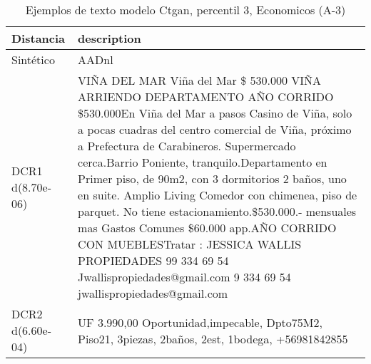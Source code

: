 \begin{table}[H]
\centering
\fontsize{10}{14}\selectfont
\caption{Ejemplos de texto modelo Ctgan, percentil 3, Economicos (A-3)}
\label{table-example-economicos-a-3-ctgan-3p-text}
\begin{tabular}{|l|m{35em}|}
\hline
\rowcolor[gray]{0.8}
Distancia & description \\
\hline Sintético & AADnl \\
\hline DCR1 d(8.70e-06) & VI\~NA DEL MAR Vi\~na del Mar \$ 530.000 VI\~NA ARRIENDO DEPARTAMENTO A\~NO CORRIDO \$530.000En Vi\~na del Mar a pasos Casino de Vi\~na, solo a pocas cuadras del centro comercial de Vi\~na, pr\'oximo a Prefectura de Carabineros. Supermercado cerca.Barrio Poniente, tranquilo.Departamento en Primer piso, de 90m2, con 3 dormitorios 2 ba\~nos, uno en suite.  Amplio Living Comedor con chimenea, piso de parquet. No tiene estacionamiento.\$530.000.- mensuales mas Gastos Comunes \$60.000 app.A\~NO CORRIDO CON MUEBLESTratar : JESSICA WALLIS PROPIEDADES         99 334 69 54         Jwallispropiedades@gmail.com 9 334 69 54 jwallispropiedades@gmail.com \\
\hline DCR2 d(6.60e-04) & UF 3.990,00 Oportunidad,impecable, Dpto75M2, Piso21, 3piezas, 2ba\~nos, 2est, 1bodega,  +56981842855 \\
\hline
\end{tabular}
\end{table}
